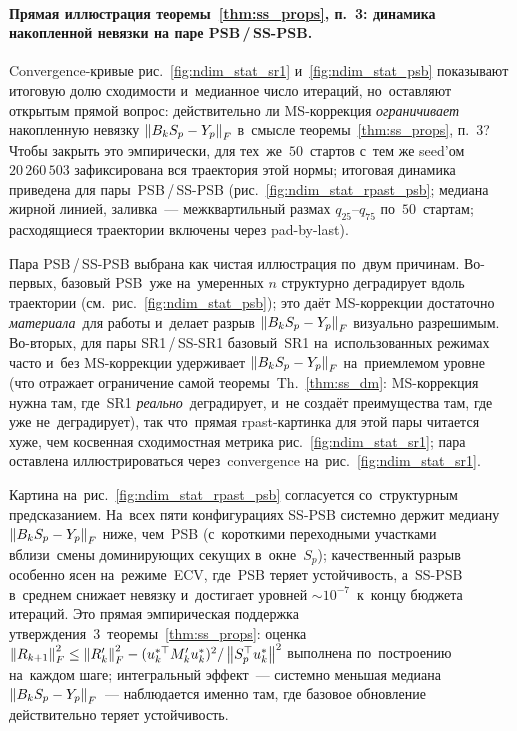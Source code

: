 \paragraph{Прямая иллюстрация теоремы~\ref{thm:ss_props}, п.~3:
  динамика накопленной невязки на паре PSB\,/\,SS-PSB.}\label{par:ssn-rpast}
Convergence-кривые рис.~\ref{fig:ndim_stat_sr1}
и~\ref{fig:ndim_stat_psb} показывают итоговую долю сходимости
и~медианное число итераций, но~оставляют открытым прямой
вопрос: действительно ли MS-коррекция \emph{ограничивает} накопленную
невязку $\left\|B_k S_p - Y_p\right\|_F$ в~смысле теоремы~\ref{thm:ss_props}, п.~3?
Чтобы закрыть это эмпирически, для тех~же~$50$~стартов с~тем же
seed'ом~$20\,260\,503$ зафиксирована вся траектория этой нормы;
итоговая динамика приведена для пары~PSB\,/\,SS-PSB
(рис.~\ref{fig:ndim_stat_rpast_psb}; медиана жирной линией,
заливка~--- межквартильный размах $q_{25}$--$q_{75}$ по~$50$~стартам;
расходящиеся траектории включены через pad-by-last).

Пара PSB\,/\,SS-PSB выбрана как чистая иллюстрация по~двум причинам.
Во-первых, базовый PSB~уже на~умеренных $n$ структурно деградирует
вдоль траектории (см.\ рис.~\ref{fig:ndim_stat_psb}); это даёт
MS-коррекции достаточно \emph{материала}~для работы и~делает разрыв
$\left\|B_k S_p - Y_p\right\|_F$ визуально разрешимым. Во-вторых, для пары
SR1\,/\,SS-SR1 базовый~SR1 на~использованных режимах часто и~без
MS-коррекции удерживает $\left\|B_k S_p - Y_p\right\|_F$ на~приемлемом
уровне (что отражает ограничение самой теоремы~Th.~\ref{thm:ss_dm}:
MS-коррекция нужна там, где~SR1 \emph{реально}~деградирует, и~не
создаёт преимущества там, где уже не~деградирует), так что~прямая
rpast-картинка для этой пары читается хуже, чем косвенная сходимостная
метрика рис.~\ref{fig:ndim_stat_sr1}; пара оставлена иллюстрироваться
через~convergence на~рис.~\ref{fig:ndim_stat_sr1}.

Картина на~рис.~\ref{fig:ndim_stat_rpast_psb} согласуется
со~структурным предсказанием. На~всех пяти конфигурациях
SS-PSB системно держит медиану $\left\|B_k S_p - Y_p\right\|_F$ ниже,
чем~PSB (с~короткими переходными участками вблизи~смены
доминирующих секущих в~окне~$S_p$); качественный разрыв
особенно ясен на~режиме~ECV, где~PSB теряет устойчивость,
а~SS-PSB в~среднем снижает невязку и~достигает уровней
$\sim\!10^{-7}$~к~концу бюджета итераций.
Это прямая эмпирическая поддержка утверждения~3~теоремы~\ref{thm:ss_props}:
оценка
$\left\|R_{k+1}\right\|_F^2 \le \left\|R'_k\right\|_F^2 -
(u_k^{*\top} M'_k u_k^*)^2/\left\|S_p^{\top} u_k^*\right\|^2$
выполнена по~построению на~каждом шаге; интегральный эффект~---
системно меньшая медиана $\left\|B_k S_p - Y_p\right\|_F$~--- наблюдается
именно там, где базовое обновление действительно теряет устойчивость.

